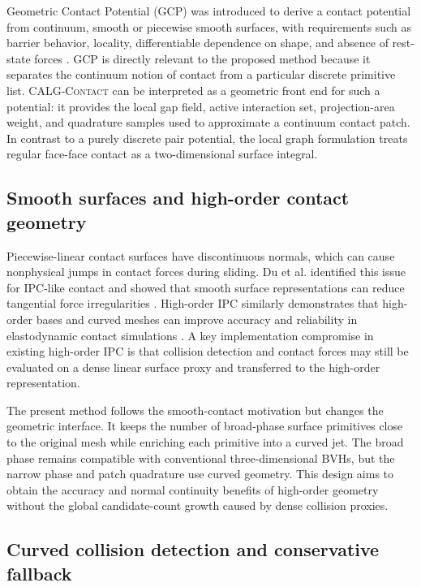 \documentclass[preprint,12pt]{elsarticle}
\newcommand{\method}{\textsc{CALG-Contact}}
\begin{document}
Geometric Contact Potential (GCP) was introduced to derive a contact potential from continuum, smooth or piecewise smooth surfaces, with requirements such as barrier behavior, locality, differentiable dependence on shape, and absence of rest-state forces \cite{huang2025gcp}. GCP is directly relevant to the proposed method because it separates the continuum notion of contact from a particular discrete primitive list. \method{} can be interpreted as a geometric front end for such a potential: it provides the local gap field, active interaction set, projection-area weight, and quadrature samples used to approximate a continuum contact patch. In contrast to a purely discrete pair potential, the local graph formulation treats regular face-face contact as a two-dimensional surface integral.

\subsection{Smooth surfaces and high-order contact geometry}

Piecewise-linear contact surfaces have discontinuous normals, which can cause nonphysical jumps in contact forces during sliding. Du et al. identified this issue for IPC-like contact and showed that smooth surface representations can reduce tangential force irregularities \cite{du2024smooth}. High-order IPC similarly demonstrates that high-order bases and curved meshes can improve accuracy and reliability in elastodynamic contact simulations \cite{ferguson2023highorder}. A key implementation compromise in existing high-order IPC is that collision detection and contact forces may still be evaluated on a dense linear surface proxy and transferred to the high-order representation.

The present method follows the smooth-contact motivation but changes the geometric interface. It keeps the number of broad-phase surface primitives close to the original mesh while enriching each primitive into a curved jet. The broad phase remains compatible with conventional three-dimensional BVHs, but the narrow phase and patch quadrature use curved geometry. This design aims to obtain the accuracy and normal continuity benefits of high-order geometry without the global candidate-count growth caused by dense collision proxies.

\subsection{Curved collision detection and conservative fallback}
\end{document}
